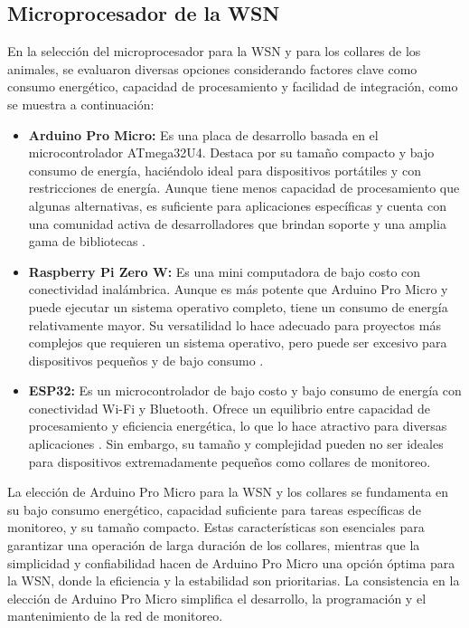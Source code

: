 \subsection{Microprocesador de la WSN}
En la selección del microprocesador para la WSN y para los collares de los animales, se evaluaron diversas opciones considerando factores clave como consumo energético, capacidad de procesamiento y facilidad de integración, como se muestra a continuación:
\begin{itemize}
\item \textbf{Arduino Pro Micro:} Es  una placa de desarrollo basada en el microcontrolador ATmega32U4. Destaca por su tamaño compacto y bajo consumo de energía, haciéndolo ideal para dispositivos portátiles y con restricciones de energía. Aunque tiene menos capacidad de procesamiento que algunas alternativas, es suficiente para aplicaciones específicas y cuenta con una comunidad activa de desarrolladores que brindan soporte y una amplia gama de bibliotecas \cite{arduino}.
\item \textbf{Raspberry Pi Zero W:} Es una mini computadora de bajo costo con conectividad inalámbrica. Aunque es más potente que Arduino Pro Micro y puede ejecutar un sistema operativo completo, tiene un consumo de energía relativamente mayor. Su versatilidad lo hace adecuado para proyectos más complejos que requieren un sistema operativo, pero puede ser excesivo para dispositivos pequeños y de bajo consumo \cite{pizero}. 
\item \textbf{ESP32:} Es un microcontrolador de bajo costo y bajo consumo de energía con conectividad Wi-Fi y Bluetooth. Ofrece un equilibrio entre capacidad de procesamiento y eficiencia energética, lo que lo hace atractivo para diversas aplicaciones \cite{esp32}. Sin embargo, su tamaño y complejidad pueden no ser ideales para dispositivos extremadamente pequeños como collares de monitoreo.
\end{itemize}
La elección de Arduino Pro Micro para la WSN y los collares se fundamenta en su bajo consumo energético, capacidad suficiente para tareas específicas de monitoreo, y su tamaño compacto. Estas características son esenciales para garantizar una operación de larga duración de los collares, mientras que la simplicidad y confiabilidad hacen de Arduino Pro Micro una opción óptima para la WSN, donde la eficiencia y la estabilidad son prioritarias. La consistencia en la elección de Arduino Pro Micro simplifica el desarrollo, la programación y el mantenimiento de la red de monitoreo.

